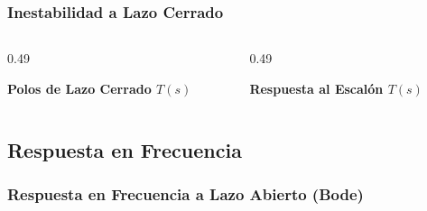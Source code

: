\begin{frame}
  \frametitle{Inestabilidad a Lazo Cerrado}

  \begin{columns}[c, onlytextwidth]
    \begin{column}{0.49\textwidth}
      \begin{tarjeta}[top=5pt, bottom=5pt]
        {\centering\fontsize{8.5pt}{10.5pt}\selectfont \textbf{\color{AlertRed} Polos de Lazo Cerrado $T(s)$}\par}
        \vspace{2pt}
        \centering
      \end{tarjeta}
    \end{column}

    \begin{column}{0.49\textwidth}
      \begin{tarjeta}[top=5pt, bottom=5pt]
        {\centering\fontsize{8.5pt}{10.5pt}\selectfont \textbf{\color{AlertRed} Respuesta al Escalón $T(s)$}\par}
        \vspace{2pt}
        \centering
      \end{tarjeta}
    \end{column}
  \end{columns}
\end{frame}

\subsection{Respuesta en Frecuencia}
\begin{frame}
  \frametitle{Respuesta en Frecuencia a Lazo Abierto (Bode)}

  \centering
\end{frame}

